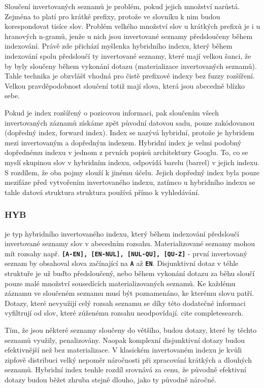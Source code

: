 \documentclass[11pt,letterpaper,oneside,openright]{book}
\newcommand{\bftt}[1]{\texttt{\textbf{#1}}}
\begin{document}
Sloučení invertovaných seznamů je problém, pokud jejich množství narůstá.
Zejména to platí pro krátké prefixy, protože ve slovníku k nim budou
korespondovat tisíce slov. Problém velkého množství slov u krátkých prefixů je
i u hranových n-gramů, jenže u nich jsou invertované seznamy předsloučeny během
indexování. Právě zde přichází myšlenka hybridního indexu, který během
indexování spolu předsloučí ty invertované seznamy, které mají velkou šanci, že
by byly sloučeny během vykonání dotazu (materializace invertovaných seznamů).
Tahle technika je obzvlášť vhodná pro čistě prefixové indexy bez fuzzy
rozšíření. Velkou pravděpodobnost sloučení totiž mají slova, která jsou
abecedně blízko sebe.

Pokud je index rozšířený o pozicovou informaci, pak sloučením všech
invertovaných záznamů získáme zpět původní datovou sadu, pouze zakódovanou
(dopředný index, forward index). Index se nazývá hybridní, protože je hybridem
mezi invertovaným a dopředným indexem.  Hybridní index je velmi podobný
dopřednému indexu v jednom z prvních popisů architektury Googlu. To, co se
myslí skupinou slov v hybridním indexu, odpovídá barelu (barrel) v jejich
indexu. S rozdílem, že oba pojmy slouží k jinému účelu. Jejich dopředný index
byla pouze mezifáze před vytvořením invertovaného indexu, zatímco u hybridního
indexu se tahle datová struktura struktura používá přímo k vyhledávání.

\subsubsection{HYB} je typ hybridního invertovaného indexu, který během
indexování předsloučí invertované seznamy slov v abecedním rozsahu.
Materializované seznamy mohou mít rozsahy např. \bftt{[A-EN], [EN-NUL],
[NUL-QU], [QU-Z]} - první invertovaný seznam by obsahoval slova
začínající na \bftt{A} až \bftt{EN}. Disjunktivní dotaz v téhle
struktuře je už buďto předsloučený, nebo během vykonání dotazu za běhu
sloučí pouze malé množství sousedících materializovaných seznamů. Ke
každému záznamu ve sloučeném seznamu musí být poznamenáno, ke kterému
slovu patří. Dotazy, které nevyužijí celý rozsah seznamu se díky této
dodatečné informaci vyfiltrují od slov, které zúženému rozsahu
neodpovídají. cite completesearch.

Tím, že jsou některé seznamy sloučeny do většího, budou dotazy, které by těchto
seznamů využily, penalizovány. Naopak komplexní disjunktivní dotazy budou
efektivnější než bez materializace. V klasickém invertovaném indexu je kvůli
zipfově distribuci velký nepoměr náročnosti při zpracování krátkých a dlouhých
seznamů. Hybridní index tenhle rozdíl srovnává za cenu, že původně efektivní
dotazy budou běžet zhruba stejně dlouho, jako ty původně náročné.
\end{document}
